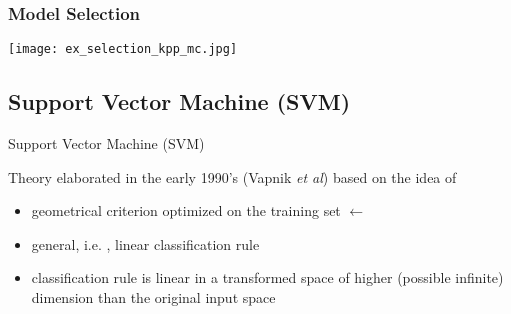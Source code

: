 \begin{frame}
  \frametitle{Model Selection}
  \begin{center}
    \texttt{[image: ex\_selection\_kpp\_mc.jpg]}
  \end{center}
\end{frame}



\subsection{Support Vector Machine (SVM)}
\begin{frame}{Support Vector Machine (SVM)}

Theory elaborated in the early 1990's (Vapnik {\em et al}) based on the idea of {}

\begin{itemize}
 \item geometrical criterion optimized on the training set $\leftarrow$  
 \item[\doigt] general, i.e. , linear classification rule
 \item[\doigt] classification rule is linear in a transformed space of higher (possible infinite) dimension than the original input space
\end{itemize}

 
\end{frame}



